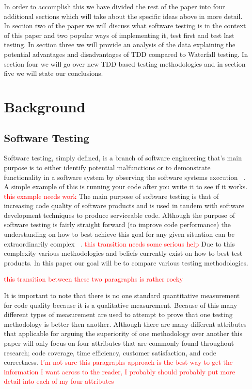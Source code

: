 \documentclass{sig-alternate}
\newcommand{\mycomment}[1]{\textcolor{red}{#1}}
\begin{document}
In order to accomplish this we have divided the rest of the paper into four additional sections which will take about the specific ideas above in more detail. In section two of the paper we will discuss what software testing is in the context of this paper and two popular ways of implementing it, test first and test last testing.  In section three we will provide an analysis of the data explaining the potential advantages and disadvantages of TDD compared to Waterfall testing.  In section four we will go over new TDD based testing methodologies and in section five we will state our conclusions.

\section{Background}
\subsection{Software Testing}
Software testing, simply defined, is a branch of software engineering that's main purpose is to either identify potential malfunctions or to demonstrate functionality in a software system by observing the software systems execution ~\cite{Bertolino:2007}.  A simple example of this is running your code after you write it to see if it works. \mycomment{this example needs work}  The main purpose of software testing is that of increasing code quality of software products and is used in tandem with software development techniques to produce serviceable code. Although the purpose of software testing is fairly straight forward (to improve code performance) the understanding on how to best achieve this goal for any given situation can be extraordinarily complex ~\cite{Bertolino:2007}. \mycomment{this transition needs some serious help}  Due to this complexity various methodologies and beliefs currently exist on how to best test products.  In this paper our goal will be to compare various testing methodologies.

\mycomment{this transition between these two paragraphs is rather rocky}

It is important to note that there is no one standard quantitative measurement for code quality because it is a qualitative measurement.  Because of this many different types of measurement are used to attempt to prove that one testing methodology is better then another.  Although there are many different attributes that applicable for arguing the superiority of one methodology over another this paper will only focus on four attributes that are commonly found throughout research; code coverage, time efficiency, customer satisfaction, and code correctness. \mycomment{I'm not sure this paragraphs approach is the best way to get the information I want across to the reader, I probably should probably put more detail into each of my four attributes}
\end{document}
